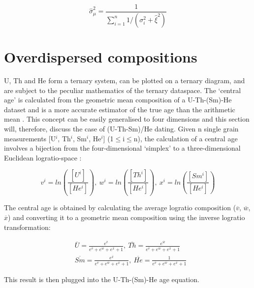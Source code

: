 \documentclass{article}
\begin{document}
\begin{equation}
\hat{\sigma}_{\mu}^2
=
\frac{1}{
\sum_{i=1}^n 1 / (\sigma_i^2 + \hat{\xi}^2)
}
\label{eq:sigma1}
\end{equation}

\section{Overdispersed compositions}
\label{sec:compositions}

U, Th and He form a ternary system, can be plotted on a ternary
diagram, and are subject to the peculiar mathematics of the ternary
dataspace. The `central age' is calculated from the geometric mean
composition of a U-Th-(Sm)-He dataset and is a more accurate estimator
of the true age than the arithmetic mean \citep{vermeesch2008a}.  This
concept can be easily generalised to four dimensions and this section
will, therefore, discuss the case of (U-Th-Sm)/He dating.  Given n
single grain measurements [U$^i$, Th$^i$, Sm$^i$, He$^i$]
(1$\leq$i$\leq$n), the calculation of a central age involves a
bijection from the four-dimensional `simplex' to a three-dimensional
Euclidean logratio-space \citep{aitchison1986, vermeesch2008a}:

\begin{equation}
  \label{eq:logratio-transform}
  v^i  =  ln\left(\frac{[U^i]}{[He^i]}\right),~
  w^i  =  ln\left(\frac{[Th^i]}{[He^i]}\right),~
  x^i  =  ln\left(\frac{[Sm^i]}{[He^i]}\right)
\end{equation}

The central age is obtained by calculating the average logratio
composition ($\overline{v}$, $\overline{w}$, $\overline{x}$) and
converting it to a geometric mean composition using the inverse
logratio transformation:

\begin{equation}
  \label{eq:inverse-transform}
\begin{split}
&  \overline{U}  =  \frac{e^{\overline{v}}}{e^{\overline{v}}+e^{\overline{w}}+e^{\overline{x}}+1},~
  \overline{Th}  =  \frac{e^{\overline{w}}}{e^{\overline{v}}+e^{\overline{w}}+e^{\overline{x}}+1}\\
&  \overline{Sm}  =  \frac{e^{\overline{x}}}{e^{\overline{v}}+e^{\overline{w}}+e^{\overline{x}}+1},~
  \overline{He}  =  \frac{1}{e^{\overline{v}}+e^{\overline{w}}+e^{\overline{x}}+1}
\end{split}
\end{equation}

This result is then plugged into the U-Th-(Sm)-He age equation.  
\\
\end{document}
